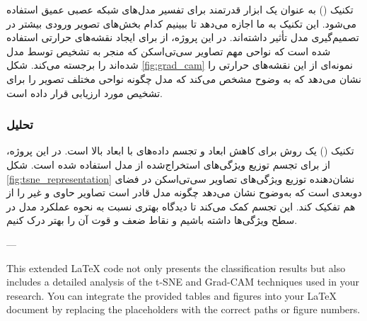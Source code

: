 تکنیک  () به عنوان یک ابزار قدرتمند برای تفسیر مدل‌های شبکه عصبی عمیق استفاده می‌شود. این تکنیک به ما اجازه می‌دهد تا ببینیم کدام بخش‌های تصویر ورودی بیشتر در تصمیم‌گیری مدل تأثیر داشته‌اند. در این پروژه، از  برای ایجاد نقشه‌های حرارتی استفاده شده است که نواحی مهم تصاویر سی‌تی‌اسکن که منجر به تشخیص  توسط مدل شده‌اند را برجسته می‌کند. شکل \ref{fig:grad_cam} نمونه‌ای از این نقشه‌های حرارتی را نشان می‌دهد که به وضوح مشخص می‌کند که مدل چگونه نواحی مختلف تصویر را برای تشخیص  مورد ارزیابی قرار داده است.

\subsubsection{تحلیل }

تکنیک  () یک روش برای کاهش ابعاد و تجسم داده‌های با ابعاد بالا است. در این پروژه، از  برای تجسم توزیع ویژگی‌های استخراج‌شده از مدل  استفاده شده است. شکل \ref{fig:tsne_representation} نشان‌دهنده توزیع ویژگی‌های تصاویر سی‌تی‌اسکن در فضای دو‌بعدی است که به‌وضوح نشان می‌دهد چگونه مدل قادر است تصاویر حاوی  و غیر  را از هم تفکیک کند. این تجسم کمک می‌کند تا دیدگاه بهتری نسبت به نحوه عملکرد مدل در سطح ویژگی‌ها داشته باشیم و نقاط ضعف و قوت آن را بهتر درک کنیم.

---

This extended LaTeX code not only presents the classification results but also includes a detailed analysis of the t-SNE and Grad-CAM techniques used in your research. You can integrate the provided tables and figures into your LaTeX document by replacing the placeholders with the correct paths or figure numbers.
